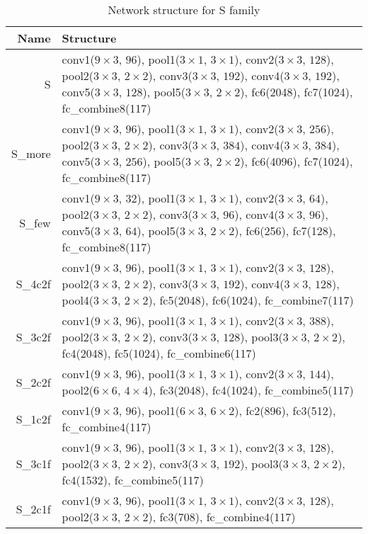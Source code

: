 \begin{table}[h]
\caption{Network structure for S family} %
\centering %
\begin{tabularx}{\textwidth}{r|X}
\hline\hline
Name & Structure \\ [0.5ex]
\hline
S & conv1($9\times3$, $96$), pool1($3\times1$, $3\times1$), conv2($3\times3$, $128$), pool2($3\times3$, $2\times2$), conv3($3\times3$, $192$), conv4($3\times3$, $192$), conv5($3\times3$, $128$), pool5($3\times3$, $2\times2$), fc6(2048), fc7(1024), fc\_combine8(117)\\
\hline
S\_more & conv1($9\times3$, $96$), pool1($3\times1$, $3\times1$), conv2($3\times3$, $256$), pool2($3\times3$, $2\times2$), conv3($3\times3$, $384$), conv4($3\times3$, $384$), conv5($3\times3$, $256$), pool5($3\times3$, $2\times2$), fc6(4096), fc7(1024), fc\_combine8(117)\\
\hline
S\_few & conv1($9\times3$, $32$), pool1($3\times1$, $3\times1$), conv2($3\times3$, $64$), pool2($3\times3$, $2\times2$), conv3($3\times3$, $96$), conv4($3\times3$, $96$), conv5($3\times3$, $64$), pool5($3\times3$, $2\times2$), fc6(256), fc7(128), fc\_combine8(117) \\
\hline
S\_4c2f & conv1($9\times3$, $96$), pool1($3\times1$, $3\times1$), conv2($3\times3$, $128$), pool2($3\times3$, $2\times2$), conv3($3\times3$, $192$), conv4($3\times3$, $128$), pool4($3\times3$, $2\times2$), fc5(2048), fc6(1024), fc\_combine7(117)\\
\hline
S\_3c2f & conv1($9\times3$, $96$), pool1($3\times1$, $3\times1$), conv2($3\times3$, $388$), pool2($3\times3$, $2\times2$), conv3($3\times3$, $128$), pool3($3\times3$, $2\times2$), fc4(2048), fc5(1024), fc\_combine6(117)\\
\hline
S\_2c2f & conv1($9\times3$, $96$), pool1($3\times1$, $3\times1$), conv2($3\times3$, $144$), pool2($6\times6$, $4\times4$), fc3(2048), fc4(1024), fc\_combine5(117)\\
\hline
S\_1c2f & conv1($9\times3$, $96$), pool1($6\times3$, $6\times2$), fc2(896), fc3(512), fc\_combine4(117)\\
\hline
S\_3c1f & conv1($9\times3$, $96$), pool1($3\times1$, $3\times1$), conv2($3\times3$, $128$), pool2($3\times3$, $2\times2$), conv3($3\times3$, $192$), pool3($3\times3$, $2\times2$), fc4(1532), fc\_combine5(117)\\
\hline
S\_2c1f & conv1($9\times3$, $96$), pool1($3\times1$, $3\times1$), conv2($3\times3$, $128$), pool2($3\times3$, $2\times2$), fc3(708), fc\_combine4(117)\\

\end{tabularx}
\end{table}
